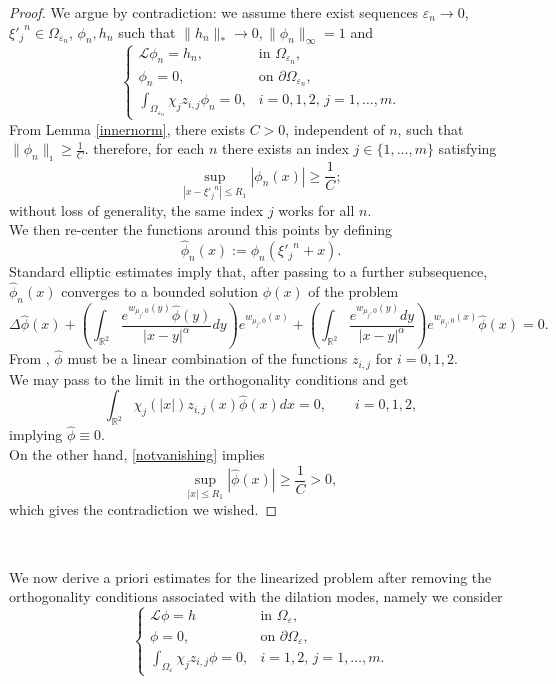\documentclass[11pt]{article}
\begin{document}
\begin{proof}
We argue by contradiction: we assume there exist sequences $\varepsilon_n\to0$, ${\xi'_j}^n\in\Omega_{\varepsilon_n}$, $\phi_n,h_n$ such that $\|h_n\|_\ast\to0,\|\phi_n\|_\infty=1$ and
$$\left\{\begin{array}{ll}
\mathcal L\phi_n=h_n,&\text{in }\Omega_{\varepsilon_n},\\
\phi_n=0,&\text{on }\partial\Omega_{\varepsilon_n},\\
\int_{\Omega_{\varepsilon_n}}\chi_jz_{i,j}\phi_n=0, &i=0,1,2,\,j=1,\dots,m.
\end{array}\right.$$
From Lemma \ref{innernorm}, there exists $C>0$, independent of $n$, such that $\|\phi_n\|_\imath\ge\frac1C$. therefore, for each $n$ there exists an index $j\in\{1,\dots,m\}$ satisfying
\begin{equation}\label{notvanishing}
\sup_{\left|x-{\xi'_j}^n\right|\le R_1}|\phi_n(x)|\ge\frac1C;
\end{equation}
without loss of generality, the same index $j$ works for all $n$.\\
We then re-center the functions around this points by defining
$$\widehat\phi_n(x):=\phi_n\left({\xi'_j}^n+x\right).$$
Standard elliptic estimates imply that, after passing to a further subsequence, $\widehat\phi_n(x)$ converges to a bounded solution $\widehat\phi(x)$ of the problem
$$\Delta\widehat\phi(x)+\left(\int_{\mathbb R^2}\frac{e^{w_{\mu_j,0}(y)}\widehat\phi(y)}{|x-y|^\alpha}dy\right)e^{w_{\mu_j,0}(x)}+\left(\int_{\mathbb R^2}\frac{e^{w_{\mu_j,0}(y)}dy}{|x-y|^\alpha}\right)e^{w_{\mu_j,0}(x)}\widehat\phi(x)=0.$$
From \cite[Theorem 1.1]{gaol}, $\widehat\phi$ must be a linear combination of the functions $z_{i,j}$ for $i=0,1,2$.\\
We may pass to the limit in the orthogonality conditions and get
$$\int_{\mathbb R^2}\chi_j(|x|)z_{i,j}(x)\widehat\phi(x)dx=0,\qquad i=0,1,2,$$
implying $\widehat\phi\equiv0$.\\
On the other hand, \eqref{notvanishing} implies
$$\sup_{|x|\le R_1}\left|\widehat\phi(x)\right|\ge\frac1C>0,$$
which gives the contradiction we wished.
\end{proof}\

We now derive a priori estimates for the linearized problem after removing the orthogonality conditions associated with the dilation modes, namely we consider
\begin{equation}\label{eq. inver 2}
\left\{\begin{array}{ll}
\mathcal L\phi=h&\text{in }\Omega_\varepsilon,\\
\phi=0,&\text{on }\partial\Omega_\varepsilon,\\
\int_{\Omega_\varepsilon}\chi_jz_{i,j}\phi=0,&i=1,2,\,j=1,\dots,m.
\end{array}\right.
\end{equation}\
\end{document}
